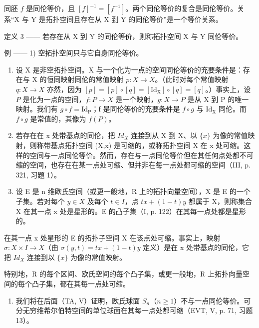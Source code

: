 同胚 \(f\) 是同伦等价，且 \([f]^{-1} = [f^{-1}]\)。两个同伦等价的复合是同伦等价。关系“X 与 Y 是拓扑空间且存在从 X 到 Y 的同伦等价”是一个等价关系。

定义 3 —— 若存在从 X 到 Y 的同伦等价，则称拓扑空间 X 与 Y 同伦等价。

例 —— 1) 空拓扑空间只与它自身同伦等价。

\begin{enumerate}
\def\labelenumi{\arabic{enumi})}
\setcounter{enumi}{1}
\item
  设 X 是非空拓扑空间。X 与一个化为一点的空间同伦等价的充要条件是：存在与 X 的恒同映射同伦的常值映射 \(p: X \rightarrow X\)。（此时对每个常值映射 \(q \colon X \to X\) 亦然，因为 \([p] = [p] \circ [q] = [\mathrm{Id}_{\mathrm{X}}] \circ [q] = [q]\)。）事实上，设 \(P\) 是化为一点的空间，\(f \colon P \to X\) 是一个映射，\(g \colon X \to P\) 是从 X 到 P 的唯一映射。我们有 \(g \circ f = \mathrm{Id}_{\mathrm{P}}\)；f 是同伦等价的充要条件是 \(f \circ g\) 与 \(\mathrm{Id}_{\mathrm{X}}\) 同伦。而 \(f \circ g\) 是常值的，其像为 \(f(P)\)。
\item
  若存在在 x 处带基点的同伦，把 \(Id_{X}\) 连接到从 X 到 X、以 \(\{x\}\) 为像的常值映射，则称带基点拓扑空间 (X,x) 是可缩的，或称拓扑空间 X 在 x 处可缩。这样的空间与一点同伦等价。然而，存在与一点同伦等价但在其任何点处都不可缩的空间，也存在在某一点处可缩、但并非在每一点处都可缩的空间（III, p. 321, 习题 1）。
\item
  设 E 是 n 维欧氏空间（或更一般地，R 上的拓扑向量空间），X 是 E 的一个子集。若对每个 \(y \in X\) 及每个 \(t \in I\)，点 \(tx + (1 - t)y\) 都属于 X，则称集合 X 在其一点 x 处是星形的。E 的凸子集（I, p. 122）在其每一点处都是星形的。
\end{enumerate}

在其一点 x 处星形的 E 的拓扑子空间 X 在该点处可缩。事实上，映射 \(\sigma\colon X \times I \to X\)（由 \(\sigma(y,t) = tx + (1 - t)y\) 定义）是在 x 处带基点的同伦，它把 \(Id_{X}\) 连接到以 \(\{x\}\) 为像的常值映射。

特别地，R 的每个区间、欧氏空间的每个凸子集，或更一般地，R 上拓扑向量空间的每个凸子集，都在其每一点处可缩。

\begin{enumerate}
\def\labelenumi{\arabic{enumi})}
\setcounter{enumi}{4}
\tightlist
\item
  我们将在后面（TA, V）证明，欧氏球面 \(S_n\)（\(n\geqslant1\)）不与一点同伦等价。可分无穷维希尔伯特空间的单位球面在其每一点处都可缩（EVT, V, p. 71, 习题 13）。
\end{enumerate}

